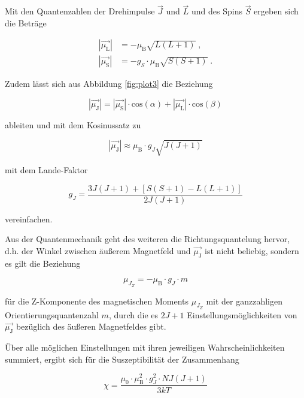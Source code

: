Mit den Quantenzahlen der Drehimpulse $\vec{J}$ und $\vec{L}$ und des Spins $\vec{S}$
ergeben sich die Beträge

\begin{align}
    |\vec{\mu_\text{L}}| &= - \mu_\text{B} \sqrt{L\left(L+1\right)} \; \text{,}\\
    |\vec{\mu_\text{S}}| &= - g_S \cdot \mu_\text{B} \sqrt{S\left(S+1\right)} \; .
\end{align}

Zudem lässt sich aus Abbildung \ref{fig:plot3} die Beziehung

\begin{equation}
    |\vec{\mu_\text{J}}| = |\vec{\mu_\text{S}}| \cdot \text{cos}\left(\alpha \right) + 
    |\vec{\mu_\text{L}}| \cdot \text{cos}\left(\beta \right)
\end{equation}

ableiten und mit dem Kosinussatz zu 

\begin{equation}
    |\vec{\mu_\text{J}}| \approx \mu_\text{B} \cdot g_J \sqrt{J\left(J+1\right)}
\end{equation}

mit dem Lande-Faktor 

\begin{equation}
    g_J = \frac{3J(J+1) + [S(S+1) - L(L+1)]} {2 J(J+1)}
\end{equation}

vereinfachen.

Aus der Quantenmechanik geht des weiteren die Richtungsquantelung hervor, d.h.
der Winkel zwischen äußerem Magnetfeld und $\vec{\mu_\text{J}}$ ist nicht beliebig,
sondern es gilt die Beziehung 

\begin{equation}
    \mu_{J_Z} = - \mu_\text{B} \cdot g_J \cdot m
\end{equation}

für die Z-Komponente des magnetischen Moments $\mu_{J_Z}$ mit der ganzzahligen 
Orientierungsquantenzahl $m$, durch die es $2J+1$ Einstellungsmöglichkeiten
von $\vec{\mu_\text{J}}$ bezüglich des äußeren Magnetfeldes gibt. 

Über alle möglichen Einstellungen mit ihren jeweiligen Wahrscheinlichkeiten summiert,
ergibt sich für die Suszeptibilität der Zusammenhang

\begin{equation}
    \chi = \frac{\mu_0 \cdot \mu_\text{B}^2 \cdot g_J^2 \cdot N J (J+1)}{3kT}
    \label{eqn:theo}
\end{equation}

